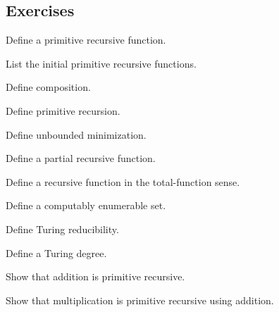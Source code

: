 \subsection{Exercises}
\label{subsec:recursion-theory-exercises}

\begin{exercise}[1]
Define a primitive recursive function.
\end{exercise}

\begin{exercise}[1]
List the initial primitive recursive functions.
\end{exercise}

\begin{exercise}[1]
Define composition.
\end{exercise}

\begin{exercise}[1]
Define primitive recursion.
\end{exercise}

\begin{exercise}[1]
Define unbounded minimization.
\end{exercise}

\begin{exercise}[1]
Define a partial recursive function.
\end{exercise}

\begin{exercise}[1]
Define a recursive function in the total-function sense.
\end{exercise}

\begin{exercise}[1]
Define a computably enumerable set.
\end{exercise}

\begin{exercise}[1]
Define Turing reducibility.
\end{exercise}

\begin{exercise}[1]
Define a Turing degree.
\end{exercise}

\begin{exercise}[2]
Show that addition is primitive recursive.
\end{exercise}

\begin{exercise}[2]
Show that multiplication is primitive recursive using addition.
\end{exercise}


